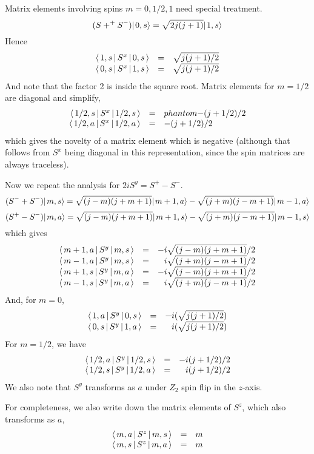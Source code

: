 \documentclass{article}[10pt]
\begin{document}
Matrix elements involving spins $m=0,1/2,1$ need special treatment.
\begin{equation}
(S+^+S^-)\hbox{$\mid \! {0,s} \rangle$} = \sqrt{2j(j+1)} \hbox{$\mid \! {1,s} \rangle$}
\end{equation}
Hence
\begin{equation}
\begin{array}{rcl}
\langle \, 1,s \, | \, S^x \, | \, 0,s \, \rangle &=& \sqrt{j(j+1)/2} \\
\langle \, 0,s \, | \, S^x \, | \, 1,s \, \rangle &=& \sqrt{j(j+1)/2} \\
\end{array}
\end{equation}
And note that the factor 2 is inside the square root.
%
Matrix elements for $m=1/2$ are diagonal and simplify,
\begin{equation}
\begin{array}{rcl}
\langle \, 1/2,s \, | \, S^x \, | \, 1/2,s \, \rangle &=&phantom{-}(j+1/2)/2 \\
\langle \, 1/2,a \, | \, S^x \, | \, 1/2,a \, \rangle &=& -(j+1/2)/2
\end{array}
\end{equation}
which gives the novelty of a matrix element which is negative
(although that follows from $S^x$ being diagonal in this representation,
since the spin matrices are always traceless).

Now we repeat the analysis for $2iS^y = S^+ - S^-$.
\[
(S^- + S^-)\hbox{$\mid \! {m,s} \rangle$} = \sqrt{(j-m)(j+m+1)} \hbox{$\mid \! {m+1,a} \rangle$}
- \sqrt{(j+m)(j-m+1)} \hbox{$\mid \! {m-1,a} \rangle$}
\]
\[
(S^+ - S^-)\hbox{$\mid \! {m,a} \rangle$} = \sqrt{(j-m)(j+m+1)} \hbox{$\mid \! {m+1,s} \rangle$}
- \sqrt{(j+m)(j-m+1)} \hbox{$\mid \! {m-1,s} \rangle$}
\]
which gives
\begin{equation}
\begin{array}{rcl}
\langle \, m+1,a \, | \, S^y \, | \, m,s \, \rangle &=& -i\sqrt{(j-m)(j+m+1)}/2 \\
\langle \, m-1,a \, | \, S^y \, | \, m,s \, \rangle &=& \phantom{-}i\sqrt{(j+m)(j-m+1)}/2 \\
\langle \, m+1,s \, | \, S^y \, | \, m,a \, \rangle &=& -i\sqrt{(j-m)(j+m+1)}/2 \\
\langle \, m-1,s \, | \, S^y \, | \, m,a \, \rangle &=& \phantom{-}i\sqrt{(j+m)(j-m+1)}/2 \\
\end{array}
\end{equation}
And, for $m=0$,
\begin{equation}
\begin{array}{rcl}
\langle \, 1,a \, | \, S^y \, | \, 0,s \, \rangle &=& -i(\sqrt{j(j+1)/2}) \\
\langle \, 0,s \, | \, S^y \, | \, 1,a \, \rangle &=& \phantom{-}i(\sqrt{j(j+1)/2}) \\
\end{array}
\end{equation}
%
For $m=1/2$, we have
\begin{equation}
\begin{array}{rcl}
\langle \, 1/2,a \, | \, S^y \, | \, 1/2,s \, \rangle &=& -i(j+1/2)/2 \\
\langle \, 1/2,s \, | \, S^y \, | \, 1/2,a \, \rangle &=& \phantom{-}i(j+1/2)/2 \\
\end{array}
\end{equation}
We also note that $S^y$ transforms as $a$ under $Z_2$ spin
flip in the $z$-axis.

For completeness, we also write down the matrix elements of $S^z$, which
also transforms as $a$,
\begin{equation}
\begin{array}{rcl}
\langle \, m,a \, | \, S^z \, | \, m,s \, \rangle &=& m \\
\langle \, m,s \, | \, S^z \, | \, m,a \, \rangle &=& m \\
\end{array}
\end{equation}
\end{document}
